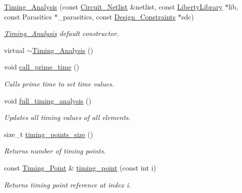 \begin{DoxyCompactItemize}
\item 
\hyperlink{classTiming__Analysis_1_1Timing__Analysis_aea46c3c9e4015f3b6802eca8a9c6d798}{Timing\-\_\-\-Analysis} (const \hyperlink{classCircuit__Netlist}{Circuit\-\_\-\-Netlist} \&netlist, const \hyperlink{classLibertyLibrary}{Liberty\-Library} $\ast$lib, const Parasitics $\ast$\-\_\-parasitics, const \hyperlink{classDesign__Constraints}{Design\-\_\-\-Constraints} $\ast$sdc)
\begin{DoxyCompactList}\small\item\em \hyperlink{classTiming__Analysis_1_1Timing__Analysis}{Timing\-\_\-\-Analysis} default constructor. \end{DoxyCompactList}\item 
virtual \hyperlink{classTiming__Analysis_1_1Timing__Analysis_a769abb84f8a930cc46972ec6b1b6c9f5}{$\sim$\-Timing\-\_\-\-Analysis} ()
\item 
void \hyperlink{classTiming__Analysis_1_1Timing__Analysis_ae98e3de81890f6e7b23b58af151e17ab}{call\-\_\-prime\-\_\-time} ()
\begin{DoxyCompactList}\small\item\em Calls prime time to set time values. \end{DoxyCompactList}\item 
void \hyperlink{classTiming__Analysis_1_1Timing__Analysis_a16566352c5a2b9da08b2c65fadd774de}{full\-\_\-timing\-\_\-analysis} ()
\begin{DoxyCompactList}\small\item\em Updates all timing values of all elements. \end{DoxyCompactList}\item 
size\-\_\-t \hyperlink{classTiming__Analysis_1_1Timing__Analysis_accd0fc851f665860214942e93242585b}{timing\-\_\-points\-\_\-size} ()
\begin{DoxyCompactList}\small\item\em Returns number of timing points. \end{DoxyCompactList}\item 
const \hyperlink{classTiming__Analysis_1_1Timing__Point}{Timing\-\_\-\-Point} \& \hyperlink{classTiming__Analysis_1_1Timing__Analysis_a15ebc83dc364a1e6ec06723658059377}{timing\-\_\-point} (const int i)
\begin{DoxyCompactList}\small\item\em Returns timing point reference at index i. \end{DoxyCompactList}\item 

\end{DoxyCompactItemize}
